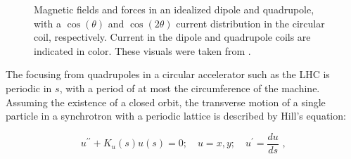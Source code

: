 \begin{figure}[htp]
    \centering
    \hspace{0.5cm}
    \caption{Magnetic fields and forces in an idealized dipole and quadrupole, with a \(\cos(\theta)\) and \(\cos(2\theta)\) current distribution in the circular coil, respectively. Current in the dipole and quadrupole coils are indicated in color. These visuals were taken from \cite{CERN:Russenschuck:CAS_Design_Magnets}.}
    \label{figure:dipole_quadrupole_fields}
\end{figure}

The focusing from quadrupoles in a circular accelerator such as the LHC is periodic in \(s\), with a period of at most the circumference of the machine.
Assuming the existence of a closed orbit, the transverse motion of a single particle in a synchrotron with a periodic lattice is described by Hill's equation:

\begin{equation}
    u^{\prime \prime} + K_u(s) u(s) = 0; \quad u = x, y; \quad u^{\prime} = \dfrac{du}{ds} \text{ ,}
    \label{equation:hill_equation}
\end{equation}

